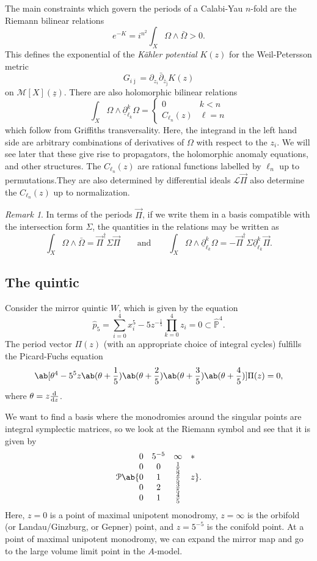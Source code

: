 \documentclass[10pt]{amsart}
\theoremstyle{definition}
\theoremstyle{remark}
\newtheorem{rmk}[thm]{Remark}
\theoremstyle{plain}
\theoremstyle{definition}
\theoremstyle{remark}
\renewcommand{\P}{\mathbb{P}}
\newcommand{\mc}[1]{\mathcal{#1}}
\newcommand{\uz}{\ul{z}}
\newcommand{\ul}[1]{\underline{#1}}
\newcommand{\1}{\mathbf{1}}
\newcommand{\2}{\mathbf{2}}
\newcommand{\3}{\mathbf{3}}
\begin{document}
The main constraints which govern the periods of a Calabi-Yau $n$-fold are the Riemann bilinear relations
\[ e^{-K} = i^{n^2} \int_X \Omega \wedge \bar{\Omega} > 0. \]
This defines the exponential of the \textit{K\"ahler potential} $K(z)$ for the Weil-Petersson metric
\[ G_{i\bar{\jmath}} = \partial_{z_i} \bar{\partial}_{\bar{z}_{\bar{\jmath}}} K(z) \]
on $\mc{M}[X](\uz)$. There are also holomorphic bilinear relations
\[ \int_X \Omega \wedge \ul{\partial}_{\ell_k}^k \Omega = \begin{cases}
    0 & k < n \\
    C_{\ell_n}(z) & \ell = n
\end{cases}
\]
which follow from Griffiths transversality. Here, the integrand in the left hand side are arbitrary combinations of derivatives of $\Omega$ with respect to the $z_i$. We will see later that these give rise to propagators, the holomorphic anomaly equations, and other structures. The $C_{\ell_n}(z)$ are rational functions labelled by $\ell_n$ up to permutations.They are also determined by differential ideals $\mc{L}\vec{\Pi}$ also determine the $C_{\ell_n}(z)$ up to normalization.

\begin{rmk}
    In terms of the periods $\vec{\Pi}$, if we write them in a basis compatible with the intersection form $\Sigma$, the quantities in the relations may be written as
    \[ \int_X \Omega \wedge \bar{\Omega} = \vec{\Pi}^{\dag} \Sigma \vec{\Pi} \qquad \text{and} \qquad \int_X \Omega \wedge \ul{\partial}_{\ell_k}^k \Omega = - \vec{\Pi}^{\dag}\Sigma \ul{\partial}_{\ell_k}^k \vec{\Pi}. \]
\end{rmk}

\subsection{The quintic}%
\label{sub:The quintic}

Consider the mirror quintic $W$, which is given by the equation
\[ \hat{p}_5 = \sum_{i=0}^4 x_i^5 - 5 z^{-\frac{1}{5}} \prod_{k=0}^4 z_i = 0 \subset \hat{\P}^4. \]
The period vector $\Pi(z)$ (with an appropriate choice of integral cycles) fulfills the Picard-Fuchs equation
\[ \ab[\theta^4 - 5^5z \ab(\theta + \frac{1}{5})\ab(\theta + \frac{2}{5})\ab(\theta + \frac{3}{5})\ab(\theta + \frac{4}{5})] \Pi(z) = 0, \]
where $\theta = z \odv{}{z}$.

We want to find a basis where the monodromies around the singular points are integral symplectic matrices, so we look at the Riemann symbol and see that it is given by
\[ \mc{P}\ab\{ \begin{matrix}
    0 & 5^{-5} & \infty & * \\
    0 & 0 & \frac{1}{5} \\
    0 & 1 & \frac{2}{5} & z \\
    0 & 2 & \frac{3}{5} \\
    0 & 1 & \frac{4}{5}
\end{matrix}
\}.\]
Here, $z=0$ is a point of maximal unipotent monodromy, $z=\infty$ is the orbifold (or Landau/Ginzburg, or Gepner) point, and $z=5^{-5}$ is the conifold point. At a point of maximal unipotent monodromy, we can expand the mirror map and go to the large volume limit point in the $A$-model.
\end{document}
